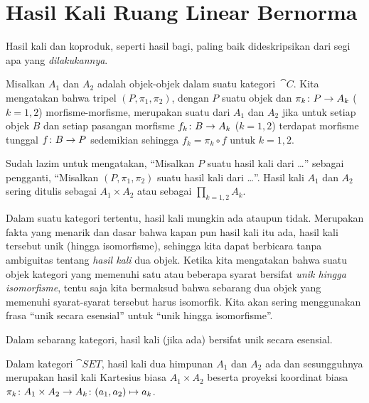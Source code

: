 \section{Hasil Kali Ruang Linear Bernorma}\label{C0155}
Hasil kali dan koproduk, seperti hasil bagi, paling baik dideskripsikan dari segi apa yang \emph{dilakukannya}.

\begin{defn}\label{C015511} Misalkan $A_1$ dan $A_2$ adalah objek-objek dalam suatu kategori~$\cat C$. Kita mengatakan bahwa
tripel $(P,\pi_1,\pi_2)$, dengan $P$ suatu objek dan $\pi_k\colon P \rightarrow A_k$ ($k =
1,2$) morfisme-morfisme, merupakan suatu
 dari $A_1$ dan $A_2$ jika untuk setiap objek $B$ dan setiap pasangan morfisme
$f_k\colon B \rightarrow A_k$ ($k = 1,2$) terdapat morfisme tunggal $f\colon B \rightarrow P$ sedemikian
sehingga $f_k = \pi_k \circ f$ untuk $k = 1,2$.

Sudah lazim untuk mengatakan, ``Misalkan $P$ suatu hasil kali dari \dots'' sebagai pengganti, ``Misalkan $(P,\pi_1,\pi_2)$
suatu hasil kali dari \dots''. Hasil kali $A_1$ dan $A_2$ sering ditulis sebagai $A_1 \times
A_2$ atau sebagai $\prod_{k = 1,2} A_k$.
\end{defn}

Dalam suatu kategori tertentu, hasil kali mungkin ada ataupun tidak. Merupakan fakta yang menarik dan
dasar bahwa kapan pun hasil kali itu ada, hasil kali tersebut unik (hingga isomorfisme), sehingga kita
dapat berbicara tanpa ambiguitas tentang \emph{hasil kali} dua objek. Ketika kita mengatakan bahwa suatu
objek kategori yang memenuhi satu atau beberapa syarat bersifat \emph{unik hingga isomorfisme}, tentu saja kita
bermaksud bahwa sebarang dua objek yang memenuhi syarat-syarat tersebut harus isomorfik. Kita
akan sering menggunakan frasa
``unik secara esensial'' untuk ``unik hingga isomorfisme''.

\begin{prop} Dalam sebarang kategori, hasil kali (jika ada) bersifat
unik secara esensial.
\end{prop}

\begin{exam}\label{C015517} Dalam kategori $\cat{SET}$,
hasil kali dua himpunan $A_1$ dan $A_2$ ada dan sesungguhnya merupakan hasil kali Kartesius biasa
$A_1 \times A_2$ beserta proyeksi koordinat biasa $\pi_k\colon A_1 \times
A_2 \rightarrow A_k \colon (a_1,a_2) \mapsto a_k$.
\end{exam}

